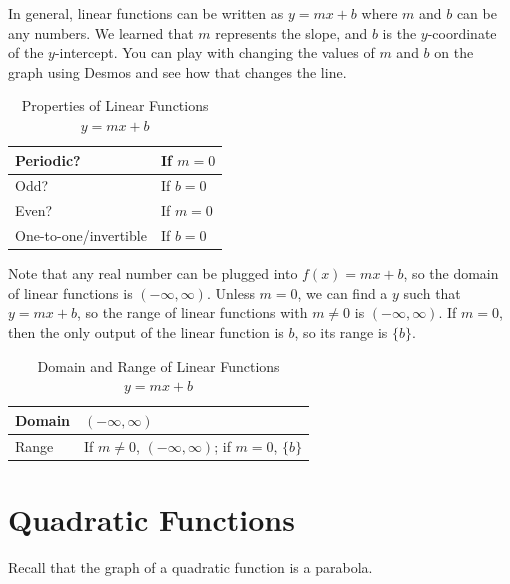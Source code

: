 \documentclass[nooutcomes]{ximera}
\begin{document}
In general, linear functions can be written as $y=mx+b$ where $m$ and $b$ can be any numbers. We learned that $m$ represents the slope, and $b$ is the $y$-coordinate of the $y$-intercept. You can play with changing the values of $m$ and $b$ on the graph using Desmos and see how that changes the line.  

\begin{center}  
\end{center}

\begin{table}[h]
\caption{\label{tab:linearproperties}Properties of Linear Functions $y = mx + b$}
\centering
\begin{tabular}{l|l}
Periodic? & If $m = 0$ \\ \hline
Odd? & If $b = 0$ \\ \hline
Even? & If $m = 0$ \\ \hline
One-to-one/invertible & If $b = 0$  
\end{tabular}
\end{table}

Note that any real number can be plugged into $f(x) = mx + b$, so the domain of linear functions is $(-\infty, \infty)$. Unless $m = 0$, we can find a $y$ such that $y = mx + b$, so the range of linear functions with $m \ne 0$ is $(-\infty, \infty)$. If $m = 0$, then the only output of the linear function is $b$, so its range is $\{b\}$. 

\begin{table}[h]
\caption{\label{tab:lineardr}Domain and Range of Linear Functions $y = mx + b$}
\centering
\begin{tabular}{l|l}
Domain & $(-\infty, \infty)$ \\ \hline
Range & If $m \ne 0$, $(-\infty, \infty)$; if $m = 0$, $\{b\}$
\end{tabular}
\end{table}

\newpage


\section{Quadratic Functions}

Recall that the graph of a quadratic function is a parabola.
\end{document}
